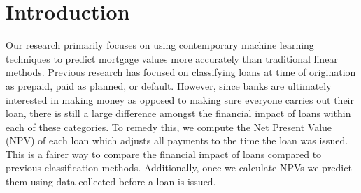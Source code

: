 \newpage
\section{Introduction}

\thispagestyle{plain}

Our research primarily focuses on using contemporary machine learning techniques to  predict mortgage values more accurately than traditional linear methods. Previous research has focused on classifying loans at time of origination as prepaid, paid as planned, or default. However, since banks are ultimately interested in making money as opposed to making sure everyone carries out their loan, there is still a large difference amongst the financial impact of loans within each of these categories. To remedy this, we compute the Net Present Value (NPV) of each loan which adjusts all payments to the time the loan was issued. This is a fairer way to compare the financial impact of loans compared to previous classification methods. Additionally, once we calculate NPVs we predict them using data collected before a loan is issued. 
